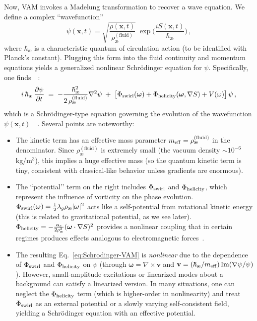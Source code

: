 \documentclass[preprint]{revtex4-2}
\begin{document}
    Now, VAM invokes a Madelung transformation to recover a wave equation. We define a complex “wavefunction”
    \begin{equation}
        \psi(\mathbf{x},t) = \sqrt{\frac{\rho(\mathbf{x},t)}{\rho_{\text{\ae}}^{(\text{fluid})}}}\;\exp\!\Big(\frac{i S(\mathbf{x},t)}{\hbar_{\text{\ae}}}\Big)\,,
        \label{eq:psi-def}
    \end{equation}
    where $\hbar_{\text{\ae}}$ is a characteristic quantum of circulation action (to be identified with Planck’s constant). Plugging this form into the fluid continuity and momentum equations yields a generalized nonlinear Schrödinger equation for $\psi$. Specifically, one finds~\cite{reference_67}~\cite{reference_68}:
    \begin{equation}
        i\,\hbar_{\text{\ae}}\,\frac{\partial \psi}{\partial t} \;=\; -\frac{\hbar_{\text{\ae}}^2}{2\,\rho_{\text{\ae}}^{(\text{fluid})}} \nabla^2 \psi \;+\; \big[\Phi_{\rm swirl}(\boldsymbol{\omega}) + \Phi_{\rm helicity}(\boldsymbol{\omega},\nabla S) + V(\omega)\big]\,\psi\,,
        \label{eq:Schrodinger-VAM}
    \end{equation}
    which is a Schrödinger-type equation governing the evolution of the wavefunction $\psi(\mathbf{x},t)$~\cite{reference_69}~\cite{reference_70}. Several points are noteworthy:
    \begin{itemize}
        \item The kinetic term has an effective mass parameter $m_{\rm eff} = \rho_{\text{\ae}}^{(\text{fluid})}$ in the denominator. Since $\rho_{\text{\ae}}^{(\text{fluid})}$ is extremely small (the vacuum density $\sim 10^{-6}$ kg/m$^3$), this implies a huge effective mass (so the quantum kinetic term is tiny, consistent with classical-like behavior unless gradients are enormous).
        \item The ``potential’’ term on the right includes $\Phi_{\rm swirl}$ and $\Phi_{\rm helicity}$, which represent the influence of vorticity on the phase evolution. $\Phi_{\rm swirl}(\boldsymbol{\omega}) = \frac{1}{2}\lambda_g \rho_{\text{\ae}} |\boldsymbol{\omega}|^2$ acts like a self-potential from rotational kinetic energy (this is related to gravitational potential, as we see later). $\Phi_{\rm helicity} = -\frac{\alpha_e}{2\rho_{\text{\ae}}^2}(\boldsymbol{\omega}\cdot \nabla S)^2$ provides a nonlinear coupling that in certain regimes produces effects analogous to electromagnetic forces~\cite{reference_71}.
        \item The resulting Eq.~\eqref{eq:Schrodinger-VAM} is \emph{nonlinear} due to the dependence of $\Phi_{\rm swirl}$ and $\Phi_{\rm helicity}$ on $\psi$ (through $\boldsymbol{\omega} = \nabla \times \mathbf{v}$ and $\mathbf{v} = (\hbar_{\text{\ae}}/m_{\rm eff}) \Im(\nabla \psi/\psi)$). However, small-amplitude excitations or linearized modes about a background can satisfy a linearized version. In many situations, one can neglect the $\Phi_{\rm helicity}$ term (which is higher-order in nonlinearity) and treat $\Phi_{\rm swirl}$ as an external potential or a slowly varying self-consistent field, yielding a Schrödinger equation with an effective potential.
    \end{itemize}
\end{document}
